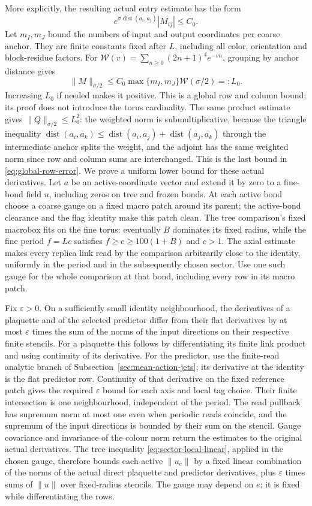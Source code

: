 More explicitly, the resulting actual entry estimate has the form
\[
 e^{\sigma\operatorname{dist}(a_i,a_j)}|M_{ij}|\le C_0.
\]
Let $m_I,m_J$ bound the numbers of input and output coordinates per
coarse anchor. They are finite constants fixed after $L$, including
all color, orientation and block-residue factors. For
$\mathcal W(v)=\sum_{n\ge0}(2n+1)^4e^{-vn}$, grouping by anchor
distance gives
\[
 \|M\|_{\sigma/2}
 \le C_0\max\{m_I,m_J\}\mathcal W(\sigma/2)=:L_0.
\]
Increasing $L_0$ if needed makes it positive. This is a global row
and column bound; its proof does not introduce the torus cardinality.
The same product estimate gives $\|Q\|_{\sigma/2}\le L_0^2$: the
weighted norm is submultiplicative, because the triangle inequality
$\operatorname{dist}(a_i,a_k)\le\operatorname{dist}(a_i,a_j)+\operatorname{dist}(a_j,a_k)$
through the intermediate anchor splits the weight, and the adjoint has
the same weighted norm since row and column sums are interchanged.
This is the last bound in \eqref{eq:global-row-error}.
We prove a uniform lower bound for these actual derivatives. Let $a$
be an active-coordinate vector and extend it by zero to a fine-bond
field $u$, including zeros on tree and frozen bonds. At each active
bond choose a coarse gauge on a fixed macro patch around its parent;
the active-bond clearance and the flag identity make this patch clean.
The tree comparison's fixed macrobox fits on the fine torus: eventually
$B$ dominates its fixed radius, while the fine period $f=Lc$ satisfies
$f\ge c\ge100(1+B)$ and $c>1$.
The axial estimate makes every replica link read by the comparison
arbitrarily close to the identity, uniformly in the period and in the
subsequently chosen sector. Use one such gauge for the whole comparison
at that bond, including every row in its macro patch.

Fix $\varepsilon>0$. On a sufficiently small identity neighbourhood,
the derivatives of a plaquette and of the selected predictor differ
from their flat derivatives by at most $\varepsilon$ times the sum of
the norms of the input directions on their respective finite stencils.
For a plaquette this follows by differentiating its finite link product
and using continuity of its derivative. For the predictor, use the
finite-read analytic branch of Subsection~\ref{sec:mean-action-jets}; its
derivative at the identity is the flat predictor row. Continuity of
that derivative on the fixed reference patch gives the required
$\varepsilon$ bound for each axis and local tag choice. Their finite
intersection is one neighbourhood, independent of the period. The
read pullback has supremum norm at most one even when periodic reads
coincide, and the supremum of the input directions is bounded by their
sum on the stencil.
Gauge covariance and invariance of the colour norm return the estimates
to the original actual derivatives. The tree inequality
\eqref{eq:sector-local-linear}, applied in the chosen gauge, therefore
bounds each active $\|u_e\|$ by a fixed linear combination of the
norms of the actual direct plaquette and predictor derivatives, plus
$\varepsilon$ times sums of $\|u\|$ over fixed-radius stencils. The
gauge may depend on $e$; it is fixed while differentiating the rows.

